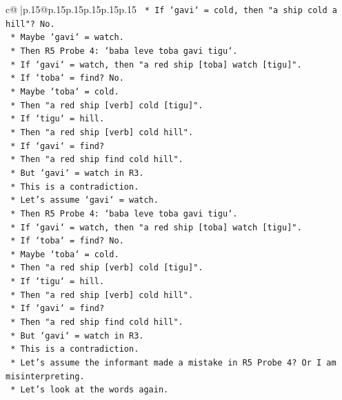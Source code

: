 \documentclass{article}
\begin{document}
{\begin{supertabular}{c@{$\;$}|p{.15\linewidth}@{}p{.15\linewidth}p{.15\linewidth}p{.15\linewidth}p{.15\linewidth}p{.15\linewidth}}
{{{\texttt{        *   If `gavi` = cold, then "a ship cold a hill"? No.} \\
\texttt{        *   Maybe `gavi` = watch.} \\
\texttt{        *   Then R5 Probe 4: `baba leve toba gavi tigu`.} \\
\texttt{        *   If `gavi` = watch, then "a red ship {[}toba{]} watch {[}tigu{]}".} \\
\texttt{        *   If `toba` = find? No.} \\
\texttt{        *   Maybe `toba` = cold.} \\
\texttt{        *   Then "a red ship {[}verb{]} cold {[}tigu{]}".} \\
\texttt{        *   If `tigu` = hill.} \\
\texttt{        *   Then "a red ship {[}verb{]} cold hill".} \\
\texttt{        *   If `gavi` = find?} \\
\texttt{        *   Then "a red ship find cold hill".} \\
\texttt{        *   But `gavi` = watch in R3.} \\
\texttt{        *   This is a contradiction.} \\
\texttt{        *   Let's assume `gavi` = watch.} \\
\texttt{        *   Then R5 Probe 4: `baba leve toba gavi tigu`.} \\
\texttt{        *   If `gavi` = watch, then "a red ship {[}toba{]} watch {[}tigu{]}".} \\
\texttt{        *   If `toba` = find? No.} \\
\texttt{        *   Maybe `toba` = cold.} \\
\texttt{        *   Then "a red ship {[}verb{]} cold {[}tigu{]}".} \\
\texttt{        *   If `tigu` = hill.} \\
\texttt{        *   Then "a red ship {[}verb{]} cold hill".} \\
\texttt{        *   If `gavi` = find?} \\
\texttt{        *   Then "a red ship find cold hill".} \\
\texttt{        *   But `gavi` = watch in R3.} \\
\texttt{        *   This is a contradiction.} \\
\texttt{        *   Let's assume the informant made a mistake in R5 Probe 4? Or I am misinterpreting.} \\
\texttt{        *   Let's look at the words again.} \\
}}}
\end{supertabular}}
\end{document}
